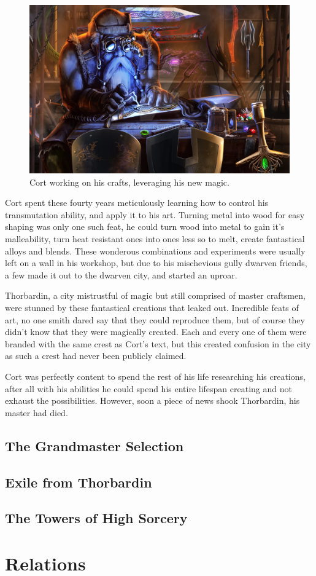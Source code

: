 \documentclass[12pt]{article}
\begin{document}
\begin{figure}[!htb]
  \centering
  \includegraphics[width=\textwidth]{./resources/arcaneshaper}
  \caption{Cort working on his crafts, leveraging his new magic.}
\end{figure}

Cort spent these fourty years meticulously learning how to control his
transmutation ability, and apply it to his art. Turning metal into wood for easy
shaping was only one such feat, he could turn wood into metal to gain it's
malleability, turn heat resistant ones into ones less so to melt, create
fantastical alloys and blends. These wonderous combinations and experiments were
usually left on a wall in his workshop, but due to his mischevious gully dwarven
friends, a few made it out to the dwarven city, and started an uproar. 

Thorbardin, a city mistrustful of magic but still comprised of master craftsmen,
were stunned by these fantastical creations that leaked out. Incredible feats of
art, no one smith dared say that they could reproduce them, but of course they
didn't know that they were magically created. Each and every one of them were
branded with the same crest as Cort's text, but this created confusion in the
city as such a crest had never been publicly claimed.

Cort was perfectly content to spend the rest of his life researching his
creations, after all with his abilities he could spend his entire lifespan
creating and not exhaust the possibilities. However, soon a piece of news shook
Thorbardin, his master had died.

\subsection{The Grandmaster Selection}

\subsection{Exile from Thorbardin}

\subsection{The Towers of High Sorcery}

\section{Relations}
\end{document}
